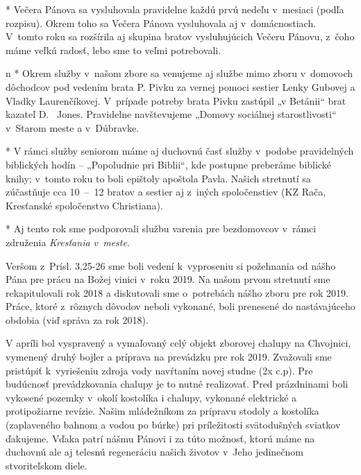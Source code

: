 * 
Večera Pánova sa vysluhovala pravidelne každú prvú nedeľu v~mesiaci (podľa rozpisu). Okrem toho sa Večera Pánova vysluhovala aj v~domácnostiach. V~tomto roku sa rozšírila aj skupina bratov vysluhujúcich Večeru Pánovu, z~čoho máme veľkú radosť, lebo sme to veľmi potrebovali.
\enditems


\begitems \style n
* 
Okrem služby v~našom zbore sa venujeme aj službe mimo zboru v~domovoch dôchodcov pod vedením brata P. Pivku za vernej pomoci sestier Lenky Gubovej a Vladky Laurenčíkovej. V~prípade potreby brata Pivku zastúpil „v Betánii“ brat kazateľ D.~ Jones. Pravidelne navštevujeme „Domovy sociálnej starostlivosti“ v~Starom meste a v~Dúbravke.

* 
V rámci služby seniorom máme aj duchovnú časť služby v~podobe pravidelných biblických hodín -- „Popoludnie pri Biblii“, kde postupne preberáme biblické knihy;  v~tomto roku to boli epištoly apoštola Pavla. Našich stretnutí sa zúčastňuje cca 10~--~12 bratov a sestier aj z~iných spoločenstiev (KZ Rača, Kresťanské spoločenstvo Christiana).

* 
Aj tento rok sme podporovali službu varenia pre bezdomovcov v~rámci združenia {\it Kresťania v~meste}.
\enditems



Veršom z~Prísl. 3,25-26 sme boli vedení k~vyproseniu si požehnania od nášho Pána pre prácu na Božej vinici v~roku 2019. Na našom prvom stretnutí sme rekapitulovali rok 2018 a diskutovali sme o~potrebách nášho zboru pre rok 2019. Práce, ktoré z~rôznych dôvodov neboli vykonané, boli prenesené do nastávajúceho obdobia (viď správa za rok 2018).

V apríli bol vyspravený a vymaľovaný celý objekt zborovej chalupy na Chvojnici, vymenený druhý bojler a príprava na prevádzku pre rok 2019. Zvažovali sme pristúpiť k~vyriešeniu zdroja vody navŕtaním novej studne (2x c.p). Pre budúcnosť prevádzkovania chalupy je to nutné realizovať. Pred prázdninami boli vykosené pozemky v~okolí kostolíka i chalupy, vykonané elektrické a protipožiarne revízie. Našim mládežníkom za prípravu stodoly a kostolíka (zaplaveného bahnom a vodou po búrke) pri príležitosti svätodušných sviatkov ďakujeme. Vďaka patrí nášmu Pánovi i za túto možnosť, ktorú máme na duchovnú ale aj telesnú regeneráciu našich životov v~Jeho jedinečnom stvoriteľskom diele.

